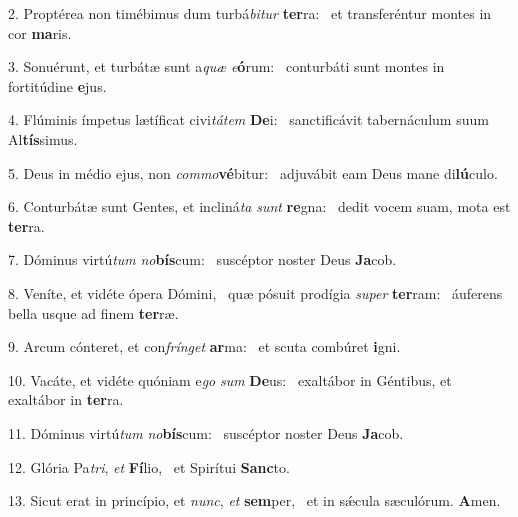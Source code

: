 2. Proptérea non timébimus dum turbá\textit{bi}\textit{tur} \textbf{ter}ra: \ast\  et transferéntur montes in cor \textbf{ma}ris.\

3. Sonuérunt, et turbátæ sunt a\textit{quæ} \textit{e}\textbf{ó}rum: \ast\  conturbáti sunt montes in fortitúdine \textbf{e}jus.\

4. Flúminis ímpetus lætíficat civi\textit{tá}\textit{tem} \textbf{De}i: \ast\  sanctificávit tabernáculum suum Al\textbf{tís}simus.\

5. Deus in médio ejus, non \textit{com}\textit{mo}\textbf{vé}bitur: \ast\  adjuvábit eam Deus mane di\textbf{lú}culo.\

6. Conturbátæ sunt Gentes, et incliná\textit{ta} \textit{sunt} \textbf{re}gna: \ast\  dedit vocem suam, mota est \textbf{ter}ra.\

7. Dóminus virtú\textit{tum} \textit{no}\textbf{bís}cum: \ast\  suscéptor noster Deus \textbf{Ja}cob.\

8. Veníte, et vidéte ópera Dómini, \dag\  quæ pósuit prodígia \textit{su}\textit{per} \textbf{ter}ram: \ast\  áuferens bella usque ad finem \textbf{ter}ræ.\

9. Arcum cónteret, et con\textit{frín}\textit{get} \textbf{ar}ma: \ast\  et scuta combúret \textbf{i}gni.\

10. Vacáte, et vidéte quóniam e\textit{go} \textit{sum} \textbf{De}us: \ast\  exaltábor in Géntibus, et exaltábor in \textbf{ter}ra.\

11. Dóminus virtú\textit{tum} \textit{no}\textbf{bís}cum: \ast\  suscéptor noster Deus \textbf{Ja}cob.\

12. Glória Pa\textit{tri}, \textit{et} \textbf{Fí}lio, \ast\  et Spirítui \textbf{Sanc}to.\

13. Sicut erat in princípio, et \textit{nunc}, \textit{et} \textbf{sem}per, \ast\  et in sǽcula sæculórum. \textbf{A}men.\

